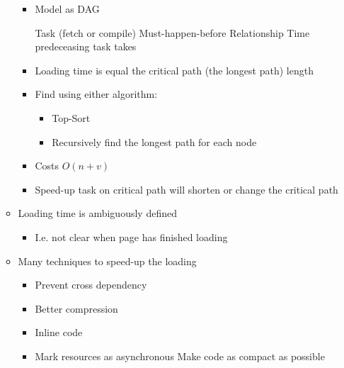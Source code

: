 \begin{itemize}
\begin{itemize}
\begin{itemize}
                    \item Model as DAG
                        \begin{itemize}
                             Task (fetch or compile)
                             Must-happen-before Relationship
                             Time predeceasing task takes
                        \end{itemize}
                    \item Loading time is equal the critical path (the longest path) length
                    \item Find using either algorithm:
                        \begin{itemize}
                            \item Top-Sort
                            \item Recursively find the longest path for each node
                        \end{itemize}
                    \item Costs $O(n + v)$
                    \item Speed-up task on critical path will shorten or change the critical path
                \end{itemize}
            \item Loading time is ambiguously defined
                \begin{itemize}
                    \item I.e. not clear when page has finished loading
                \end{itemize}
        \end{itemize}
        \begin{itemize}
            \item Many techniques to speed-up the loading
                \begin{itemize}
                    \item Prevent cross dependency
                    \item Better compression
                    \item Inline code
                    \item Mark resources as asynchronous
                         Make code as compact as possible
                \end{itemize}
                \begin{itemize}

\end{itemize}
\end{itemize}
\end{itemize}
